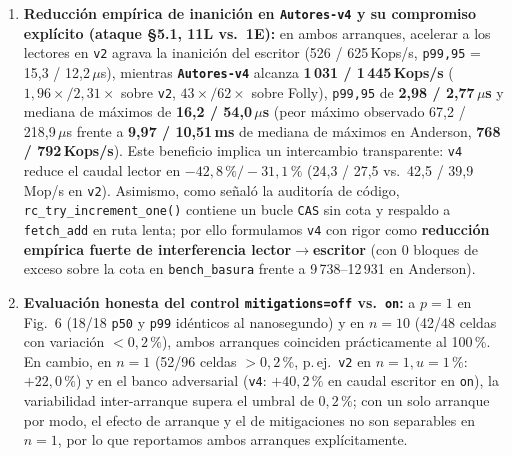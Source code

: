 \documentclass[11pt,a4paper]{article}
\begin{document}
\begin{enumerate}
  \item \textbf{Reducción empírica de inanición en \texttt{Autores-v4} y su compromiso explícito (ataque \S 5.1, 11L vs.\ 1E):} en ambos arranques, acelerar a los lectores en \texttt{v2} agrava la inanición del escritor (526 / 625\,Kops/s, \texttt{p99,95} = 15{,}3 / 12{,}2\,$\mu$s), mientras \textbf{\texttt{Autores-v4}} alcanza \textbf{1\,031 / 1\,445\,Kops/s} ($1{,}96\times / 2{,}31\times$ sobre \texttt{v2}, $43\times / 62\times$ sobre Folly), \texttt{p99,95} de \textbf{2{,}98 / 2{,}77\,$\mu$s} y mediana de máximos de \textbf{16{,}2 / 54{,}0\,$\mu$s} (peor máximo observado 67{,}2 / 218{,}9\,$\mu$s frente a \textbf{9{,}97 / 10{,}51\,ms} de mediana de máximos en Anderson, \textbf{768 / 792\,Kops/s}). Este beneficio implica un intercambio transparente: \texttt{v4} reduce el caudal lector en $-42{,}8\,\% / -31{,}1\,\%$ (24{,}3 / 27{,}5 vs.\ 42{,}5 / 39{,}9\,Mop/s en \texttt{v2}). Asimismo, como señaló la auditoría de código, \texttt{rc\_try\_increment\_one()} contiene un bucle \texttt{CAS} sin cota y respaldo a \texttt{fetch\_add} en ruta lenta; por ello formulamos \texttt{v4} con rigor como \textbf{reducción empírica fuerte de interferencia lector$\to$escritor} (con 0 bloques de exceso sobre la cota en \texttt{bench\_basura} frente a 9\,738--12\,931 en Anderson).

  \item \textbf{Evaluación honesta del control \texttt{mitigations=off} vs.\ \texttt{on}:} a $p=1$ en Fig.~6 (18/18 \texttt{p50} y \texttt{p99} idénticos al nanosegundo) y en $n=10$ (42/48 celdas con variación $<0{,}2\,\%$), ambos arranques coinciden prácticamente al 100\,\%. En cambio, en $n=1$ (52/96 celdas $>0{,}2\,\%$, p.\,ej.\ \texttt{v2} en $n=1, u=1\,\%$: $+22{,}0\,\%$) y en el banco adversarial (\texttt{v4}: $+40{,}2\,\%$ en caudal escritor en \texttt{on}), la variabilidad inter-arranque supera el umbral de $0{,}2\,\%$; con un solo arranque por modo, el efecto de arranque y el de mitigaciones no son separables en $n=1$, por lo que reportamos ambos arranques explícitamente.


\end{enumerate}
\end{document}
